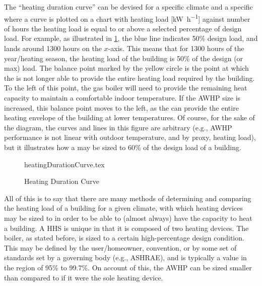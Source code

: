 The ``heating duration curve'' can be devised for a specific climate and a specific \HP where a curve is plotted on a chart with heating load [\unit{\kilo\watt\per\hour}] against number of hours the heating load is equal to or above a selected percentage of design load. For example, as illustrated in \cref{fig:heatingloaddurationcurve}, the blue line indicates 50\% design load, and lands around 1300 hours on the $x$-axis. This means that for 1300 hours of the year/heating season, the heating load of the building is 50\% of the design (or max) load. The balance point marked by the yellow circle is the point at which the \HP is not longer able to provide the entire heating load required by the building. To the left of this point, the gas boiler will need to provide the remaining heat capacity to maintain a comfortable indoor temperature. If the \ac{AWHP} size is increased, this balance point moves to the left, as the \HP can provide the entire heating envelope of the building at lower temperatures. Of course, for the sake of the diagram, the curves and lines in this figure are arbitrary (e.g., \ac{AWHP} performance is not linear with outdoor temperature, and by proxy, heating load), but it illustrates how a \HP may be sized to 60\% of the design load of a building.

\begin{figure}[htb]
    \centering
    {heatingDurationCurve.tex}
    \caption{Heating Duration Curve}
    \label{fig:heatingloaddurationcurve}
\end{figure}

All of this is to say that there are many methods of determining and comparing the heating load of a building for a given climate, with which heating devices may be sized to in order to be able to (almost always) have the capacity to heat a building. A \ac{HHS} is unique in that it is composed of two heating devices. The boiler, as stated before, is sized to a certain high-percentage design condition. This may be defined by the user/homeowner, convention, or by some set of standards set by a governing body (e.g., ASHRAE), and is typically a value in the region of 95\% to 99.7\%. On account of this, the \ac{AWHP} can be sized smaller than compared to if it were the sole heating device.

